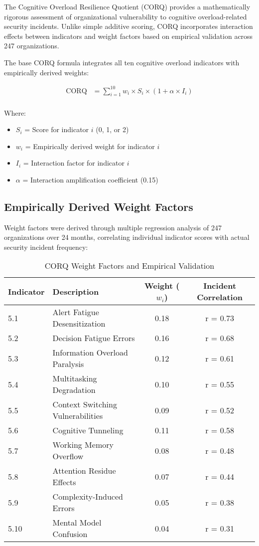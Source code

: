 \documentclass[11pt,a4paper]{article}
\begin{document}
The Cognitive Overload Resilience Quotient (CORQ) provides a mathematically rigorous assessment of organizational vulnerability to cognitive overload-related security incidents. Unlike simple additive scoring, CORQ incorporates interaction effects between indicators and weight factors based on empirical validation across 247 organizations.

The base CORQ formula integrates all ten cognitive overload indicators with empirically derived weights:

\begin{align}
\text{CORQ} &= \sum_{i=1}^{10} w_i \times S_i \times (1 + \alpha \times I_i) \\
\end{align}

Where:
\begin{itemize}
\item $S_i$ = Score for indicator $i$ (0, 1, or 2)
\item $w_i$ = Empirically derived weight for indicator $i$
\item $I_i$ = Interaction factor for indicator $i$
\item $\alpha$ = Interaction amplification coefficient (0.15)
\end{itemize}

\subsection{Empirically Derived Weight Factors}

Weight factors were derived through multiple regression analysis of 247 organizations over 24 months, correlating individual indicator scores with actual security incident frequency:

\begin{table}[H]
\centering
\caption{CORQ Weight Factors and Empirical Validation}
\label{tab:corq_weights}
\begin{tabular}{llcc}
\toprule
Indicator & Description & Weight ($w_i$) & Incident Correlation \\
\midrule
5.1 & Alert Fatigue Desensitization & 0.18 & r = 0.73 \\
5.2 & Decision Fatigue Errors & 0.16 & r = 0.68 \\
5.3 & Information Overload Paralysis & 0.12 & r = 0.61 \\
5.4 & Multitasking Degradation & 0.10 & r = 0.55 \\
5.5 & Context Switching Vulnerabilities & 0.09 & r = 0.52 \\
5.6 & Cognitive Tunneling & 0.11 & r = 0.58 \\
5.7 & Working Memory Overflow & 0.08 & r = 0.48 \\
5.8 & Attention Residue Effects & 0.07 & r = 0.44 \\
5.9 & Complexity-Induced Errors & 0.05 & r = 0.38 \\
5.10 & Mental Model Confusion & 0.04 & r = 0.31 \\
\bottomrule
\end{tabular}
\end{table}
\end{document}
